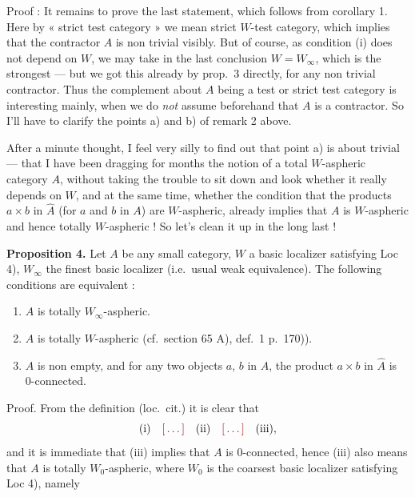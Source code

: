 \documentclass[11pt,a4paper]{article}
\begin{document}
Proof :  It remains to prove the last statement, which follows
from corollary 1. Here by « strict test category » we mean strict $W$-test
category, which implies that the contractor $A$ is non trivial visibly. But of
course, as condition (i) does not depend on $W$, we may take in the last
conclusion $W = W_{\infty}$, which is the strongest --- but we got this already
by prop.\ 3 directly, for any non trivial contractor. Thus the complement about
$A$ being a test or strict test category is interesting mainly, when we do \emph{not}
assume beforehand that $A$ is a contractor. So I'll have to clarify the points
a) and b) of remark 2 above.

After a minute thought, I feel very silly to find out that point a) is
about trivial --- that I have been dragging for months the notion of a
total $W$-aspheric category $A$, without taking the trouble to sit down
and look whether it really depends on $W$, and at the same time, whether the
condition that the products $a \times b$ in $\hat{A}$ (for $a$ and $b$ in $A$)
are $W$-aspheric, already implies that $A$ is $W$-aspheric and hence totally
$W$-aspheric ! So let's clean it up in the long last !

\textbf{Proposition 4.} Let $A$ be any small category, $W$ a basic localizer
satisfying Loc 4), $W_{\infty}$ the finest basic localizer (i.e.\ usual weak
equivalence). The following conditions are equivalent :

\begin{enumerate}
\item[(i)] $A$ is totally $W_{\infty}$-aspheric.

\item[(ii)] $A$ is totally $W$-aspheric (cf.\ section 65 A), def.\ 1 p.\ 170)).

\item[(iii)] $A$ is non empty, and for any two objects $a$, $b$ in $A$,  the
product $a \times b$ in $\hat{A}$ is 0-connected.
\end{enumerate}

Proof. From the definition (loc.\ cit.) it is clear that
\[
\text{(i)} \quad \ill \quad \text{(ii)} \quad \ill \quad \text{(iii)},
\]
and it is immediate that (iii) implies that $A$ is 0-connected, hence (iii)
also means that $A$ is totally $W_{0}$-aspheric, where $W_{0}$ is the coarsest
basic localizer satisfying Loc 4), namely

\end{document}
